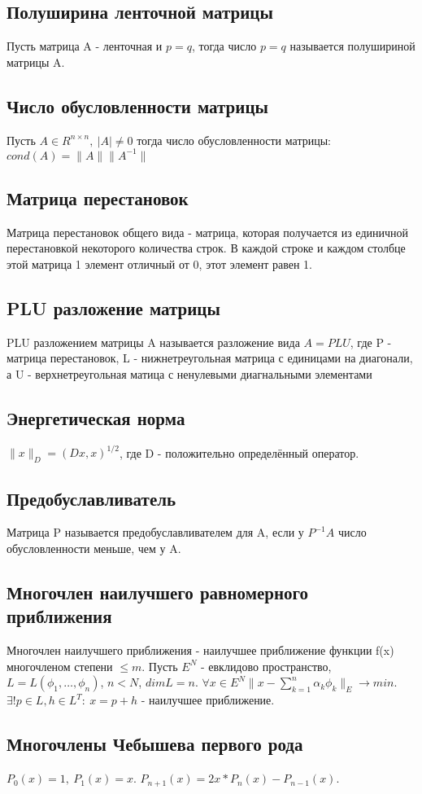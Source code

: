 \documentclass[9pt]{article}
\begin{document}
 	\subsection{Полуширина ленточной матрицы}
 		Пусть матрица A - ленточная и $p = q$, тогда число $p=q$  называется полушириной матрицы A.
 	\subsection{Число обусловленности матрицы}
 		Пусть $A\in R^{n \times n}, \ |A| \neq 0$ тогда число обусловленности матрицы: $cond(A) = \|A\| \| A^{-1} \|$
 	\subsection{Матрица перестановок}
 		Матрица перестановок общего вида - матрица, которая получается из единичной перестановкой некоторого количества строк. В каждой строке и каждом столбце этой матрица 1 элемент отличный от 0, этот элемент равен 1.
 	\subsection{PLU разложение матрицы}
 		PLU разложением матрицы A называется разложение вида $A = PLU$, где P - матрица перестановок, L - нижнетреугольная матрица с единицами на диагонали, а U - верхнетреугольная матица с ненулевыми диагнальными элементами
 	\subsection{Энергетическая норма}
 		$\| x\|_D = (Dx, x)^{1/2}$, где D - положительно определённый оператор.
 	\subsection{Предобуславливатель}
 		Матрица P называется предобуславливателем для A, если у $P^{-1} A$ число обусловленности меньше, чем у A. 
 	\subsection{Многочлен наилучшего равномерного приближения}
 		Многочлен наилучшего приближения - наилучшее приближение функции f(x) многочленом степени $\leq m$. Пусть $E^N$ - евклидово пространство, $L =  L(\phi_1, \dots, \phi_n)$, $n < N$, $dim L = n$. $\forall x \in E^N  \| x - \sum\limits_{k=1}^n \alpha_k \phi_k \|_E \to min$. $\exists ! p \in L , h \in L^T: \ x = p + h$ - наилучшее приближение.
 	\subsection{Многочлены Чебышева первого рода}
 		$P_0(x) = 1, \ P_1(x) = x$. $P_{n+1}(x) = 2x* P_n(x) - P_{n-1}(x)$. 
\end{document}

